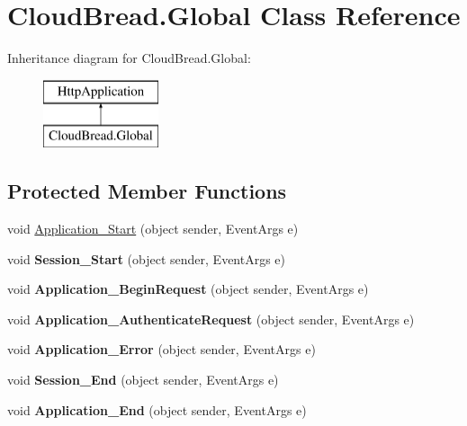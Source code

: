 \hypertarget{a00075}{}\section{Cloud\+Bread.\+Global Class Reference}
\label{a00075}
Inheritance diagram for Cloud\+Bread.\+Global\+:\begin{figure}[H]
\begin{center}
\leavevmode
\includegraphics[height=2.000000cm]{a00075}
\end{center}
\end{figure}
\subsection*{Protected Member Functions}
\begin{DoxyCompactItemize}
\item 
void \hyperlink{a00075_a396d25a39052b762fa2213e392ddc797}{Application\+\_\+\+Start} (object sender, Event\+Args e)
\item 
void {\bfseries Session\+\_\+\+Start} (object sender, Event\+Args e)\hypertarget{a00075_a8708272a1a0e193b8d608c204b915e40}{}\label{a00075_a8708272a1a0e193b8d608c204b915e40}

\item 
void {\bfseries Application\+\_\+\+Begin\+Request} (object sender, Event\+Args e)\hypertarget{a00075_a1876449576a2bb502623da2c132321d8}{}\label{a00075_a1876449576a2bb502623da2c132321d8}

\item 
void {\bfseries Application\+\_\+\+Authenticate\+Request} (object sender, Event\+Args e)\hypertarget{a00075_a4e8a04fe20ec51fa332bc9de44c169b6}{}\label{a00075_a4e8a04fe20ec51fa332bc9de44c169b6}

\item 
void {\bfseries Application\+\_\+\+Error} (object sender, Event\+Args e)\hypertarget{a00075_a28279fb2abc32e11a0bb8426883c218f}{}\label{a00075_a28279fb2abc32e11a0bb8426883c218f}

\item 
void {\bfseries Session\+\_\+\+End} (object sender, Event\+Args e)\hypertarget{a00075_a2837df16b0eae9e085156b8e064c4f14}{}\label{a00075_a2837df16b0eae9e085156b8e064c4f14}

\item 
void {\bfseries Application\+\_\+\+End} (object sender, Event\+Args e)\hypertarget{a00075_abbeb7280f6d00e11731d635e24aae8f3}{}\label{a00075_abbeb7280f6d00e11731d635e24aae8f3}

\end{DoxyCompactItemize}


